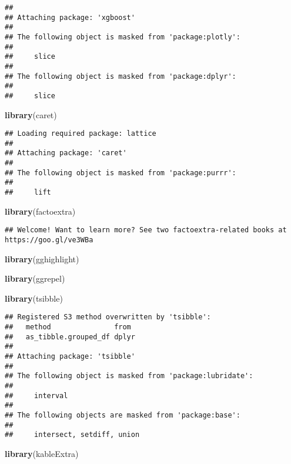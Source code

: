 \documentclass[
]{article}
\newenvironment{Shaded}{\begin{snugshade}}{\end{snugshade}}
\newcommand{\FunctionTok}[1]{\textcolor[rgb]{0.13,0.29,0.53}{\textbf{#1}}}
\newcommand{\NormalTok}[1]{#1}
\begin{document}
\begin{verbatim}
## 
## Attaching package: 'xgboost'
## 
## The following object is masked from 'package:plotly':
## 
##     slice
## 
## The following object is masked from 'package:dplyr':
## 
##     slice
\end{verbatim}

\begin{Shaded}
\begin{Highlighting}[]
\FunctionTok{library}\NormalTok{(caret)   }
\end{Highlighting}
\end{Shaded}

\begin{verbatim}
## Loading required package: lattice
## 
## Attaching package: 'caret'
## 
## The following object is masked from 'package:purrr':
## 
##     lift
\end{verbatim}

\begin{Shaded}
\begin{Highlighting}[]
\FunctionTok{library}\NormalTok{(factoextra) }
\end{Highlighting}
\end{Shaded}

\begin{verbatim}
## Welcome! Want to learn more? See two factoextra-related books at https://goo.gl/ve3WBa
\end{verbatim}

\begin{Shaded}
\begin{Highlighting}[]
\FunctionTok{library}\NormalTok{(gghighlight)}

\FunctionTok{library}\NormalTok{(ggrepel)}

\FunctionTok{library}\NormalTok{(tsibble)}
\end{Highlighting}
\end{Shaded}

\begin{verbatim}
## Registered S3 method overwritten by 'tsibble':
##   method               from 
##   as_tibble.grouped_df dplyr
## 
## Attaching package: 'tsibble'
## 
## The following object is masked from 'package:lubridate':
## 
##     interval
## 
## The following objects are masked from 'package:base':
## 
##     intersect, setdiff, union
\end{verbatim}

\begin{Shaded}
\begin{Highlighting}[]
\FunctionTok{library}\NormalTok{(kableExtra)}
\end{Highlighting}
\end{Shaded}
\end{document}
